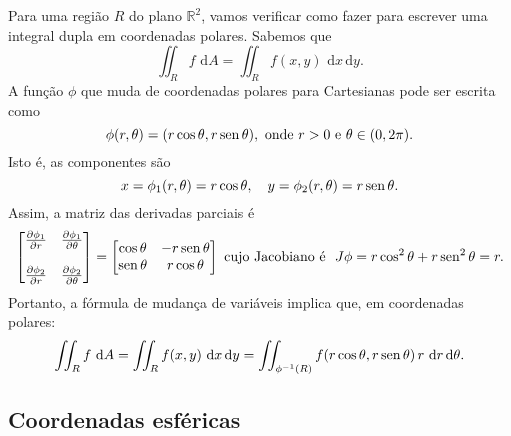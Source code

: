 \documentclass[../livro.tex]{subfiles}  %
\begin{document}
Para uma região $R$ do plano $\mathbb{R}^2$, vamos verificar como fazer para escrever uma integral dupla em coordenadas polares. Sabemos que
\begin{equation}
\iint_R f \, \, \mathrm{d} A = \iint_R f(x,y) \, \, \mathrm{d} x \, \mathrm{d} y.
\end{equation} A função $\phi$ que muda de coordenadas polares para Cartesianas pode ser escrita como
\begin{equation}
\phi (r, \theta) = (r\cos \theta, r \operatorname{sen} \theta), \text{ onde } r> 0 \text{ e } \theta \in (0,2\pi).
\end{equation} Isto é, as componentes são
\begin{equation}
x = \phi_1 (r, \theta) = r\cos \theta, \quad y = \phi_2 (r, \theta) = r \operatorname{sen} \theta.
\end{equation} Assim, a matriz das derivadas parciais é
\begin{equation}
\begin{bmatrix}
\frac{\partial \phi_1}{\partial r} & \frac{\partial \phi_1}{\partial \theta} \\
& \\
\frac{\partial \phi_2}{\partial r} & \frac{\partial \phi_2}{\partial \theta} \\
\end{bmatrix} = 
\begin{bmatrix}
\cos \theta & -r \operatorname{sen} \theta \\
\operatorname{sen} \theta & r \cos \theta \\
\end{bmatrix}
 \text{ cujo Jacobiano é } \ J\phi = r \cos^2 \theta + r \operatorname{sen}^2 \theta = r. 
\end{equation} Portanto, a fórmula de mudança de variáveis implica que, em coordenadas polares:
\begin{equation}
\iint_R f \, \, \mathrm{d} A = \iint_R f(x,y) \, \, \mathrm{d} x \, \mathrm{d} y = \iint_{\phi^{-1}(R)} f(r\cos \theta, r\operatorname{sen} \theta) \, r \, \, \mathrm{d} r \, \mathrm{d} \theta.
\end{equation}


\subsection{Coordenadas esféricas}
\end{document}
